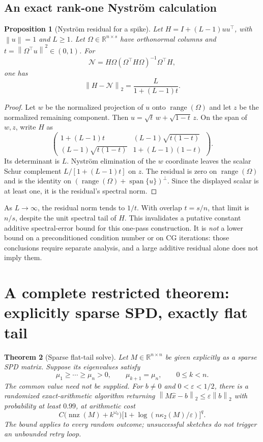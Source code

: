 \documentclass[11pt,a4paper]{article}
\newcommand{\R}{\mathbb R}
\newcommand{\nnz}{\operatorname{nnz}}
\newcommand{\range}{\operatorname{range}}
\newcommand{\cond}{\kappa_2}
\newcommand{\eps}{\varepsilon}
\newcommand{\norm}[1]{\left\lVert #1\right\rVert}
\newtheorem{theorem}{Theorem}[section]
\newtheorem{proposition}[theorem]{Proposition}
\theoremstyle{definition}
\theoremstyle{remark}
\begin{document}
\subsection{An exact rank-one Nystr\"om calculation}
\begin{proposition}[Nystr\"om residual for a spike]
\label{prop:nystrom}
Let $H=I+(L-1)uu^\top$, with $\norm u=1$ and $L\ge1$. Let $\Omega\in\R^{n\times s}$ have orthonormal columns and
$t=\norm{\Omega^\top u}^2\in(0,1)$. For
\[
 \mathcal N=H\Omega(\Omega^\top H\Omega)^{-1}\Omega^\top H,
\]
one has
\begin{equation}
 \norm{H-\mathcal N}_2=\frac{L}{1+(L-1)t}. \label{eq:nystrom-error}
\end{equation}
\end{proposition}
\begin{proof}
Let $w$ be the normalized projection of $u$ onto $\range(\Omega)$ and let $z$ be the normalized remaining component. Then
$u=\sqrt t\,w+\sqrt{1-t}\,z$. On the span of $w,z$, write $H$ as
\[
 \begin{pmatrix}
  1+(L-1)t &(L-1)\sqrt{t(1-t)}\\
  (L-1)\sqrt{t(1-t)}&1+(L-1)(1-t)
 \end{pmatrix}.
\]
Its determinant is $L$. Nystr\"om elimination of the $w$ coordinate leaves the scalar Schur complement $L/[1+(L-1)t]$ on $z$. The residual is zero on $\range(\Omega)$ and is the identity on $(\range(\Omega)+\operatorname{span}\{u\})^\perp$. Since the displayed scalar is at least one, it is the residual's spectral norm.
\end{proof}

As $L\to\infty$, the residual norm tends to $1/t$. With overlap $t=s/n$, that limit is $n/s$, despite the unit spectral tail of $H$. This invalidates a putative constant additive spectral-error bound for this one-pass construction. It is \emph{not} a lower bound on a preconditioned condition number or on CG iterations: those conclusions require separate analysis, and a large additive residual alone does not imply them.

\section{A complete restricted theorem: explicitly sparse SPD, exactly flat tail}
\label{sec:flat}
\begin{theorem}[Sparse flat-tail solve]
\label{thm:flat}
Let $M\in\R^{n\times n}$ be given explicitly as a sparse SPD matrix. Suppose its eigenvalues satisfy
\[
 \mu_1\ge\cdots\ge\mu_n>0,\qquad \mu_{k+1}=\mu_n,
 \qquad 0\le k<n.
\]
The common value need not be supplied. For $b\ne0$ and $0<\eps<1/2$, there is a randomized exact-arithmetic algorithm returning
$\norm{M\widehat x-b}_2\le\eps\norm b_2$ with probability at least $0.99$, at arithmetic cost
\begin{equation}
 C\bigl(\nnz(M)+k^{\omega_0}\bigr)
 \bigl[1+\log(n\cond(M)/\eps)\bigr]^q. \label{eq:flat-cost}
\end{equation}
The bound applies to every random outcome; unsuccessful sketches do not trigger an unbounded retry loop.
\end{theorem}
\end{document}
